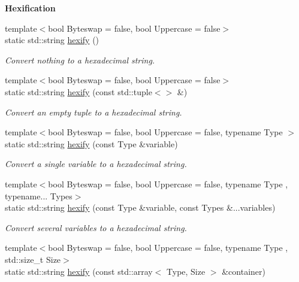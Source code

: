 \begin{Indent}{\bf Hexification}\par
\begin{DoxyCompactItemize}
\item 
{\footnotesize template$<$bool Byteswap = false, bool Uppercase = false$>$ }\\static std\-::string \hyperlink{exceptionmagrathea_1_1DataHandler_a2ced7c88930c8cb63f53ae8ccd7d8869}{hexify} ()
\begin{DoxyCompactList}\small\item\em Convert nothing to a hexadecimal string. \end{DoxyCompactList}\item 
{\footnotesize template$<$bool Byteswap = false, bool Uppercase = false$>$ }\\static std\-::string \hyperlink{exceptionmagrathea_1_1DataHandler_a5e509568af157f6b3fafaa6d7b77ee5d}{hexify} (const std\-::tuple$<$$>$ \&)
\begin{DoxyCompactList}\small\item\em Convert an empty tuple to a hexadecimal string. \end{DoxyCompactList}\item 
{\footnotesize template$<$bool Byteswap = false, bool Uppercase = false, typename Type $>$ }\\static std\-::string \hyperlink{exceptionmagrathea_1_1DataHandler_af6a8e6e71817c4ff9f3e09ffd2440713}{hexify} (const Type \&variable)
\begin{DoxyCompactList}\small\item\em Convert a single variable to a hexadecimal string. \end{DoxyCompactList}\item 
{\footnotesize template$<$bool Byteswap = false, bool Uppercase = false, typename Type , typename... Types$>$ }\\static std\-::string \hyperlink{exceptionmagrathea_1_1DataHandler_a87cdcecdb302b79db66f8781d92d2a38}{hexify} (const Type \&variable, const Types \&...variables)
\begin{DoxyCompactList}\small\item\em Convert several variables to a hexadecimal string. \end{DoxyCompactList}\item 
{\footnotesize template$<$bool Byteswap = false, bool Uppercase = false, typename Type , std\-::size\-\_\-t Size$>$ }\\static std\-::string \hyperlink{exceptionmagrathea_1_1DataHandler_a537df36d100df807e95e9fe4297ce788}{hexify} (const std\-::array$<$ Type, Size $>$ \&container)
$$
\end{DoxyCompactItemize}
\end{Indent}
